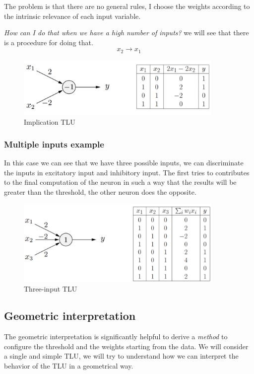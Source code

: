 \documentclass{article}
\begin{document}
The problem is that there are no general rules, I choose the weights according to the intrinsic relevance of each
input variable.

\textit{How can I do that when we have a high number of inputs?} we will see that there is a procedure for doing that.
$$x_2\rightarrow x_1$$
\begin{figure}[H]
    \centering
    \includegraphics[width=10cm]{images/impl_TLU.png}
    \caption{Implication TLU}
    \label{fig:tlu_implication}
\end{figure}

\subsubsection{Multiple inputs example}
In this case we can see that we have three possible inputs, we can discriminate the
inputs in excitatory input and inhibitory input. The first tries to contributes
to the final computation of the neuron in such a way that the results
will be greater than the threshold, the other neuron does the opposite.

\begin{figure}[H]
    \centering
    \includegraphics[width=10cm]{images/complex_TLU.png}
    \caption{Three-input TLU}
    \label{fig:tlu_3_input}
\end{figure}

\subsection{Geometric interpretation}
The geometric interpretation is significantly helpful to derive a \textit{method} to
configure the threshold and the weights starting from the data. We will consider a
single and simple TLU, we will try to understand how we can interpret the
behavior of the TLU in a geometrical way.
\end{document}
